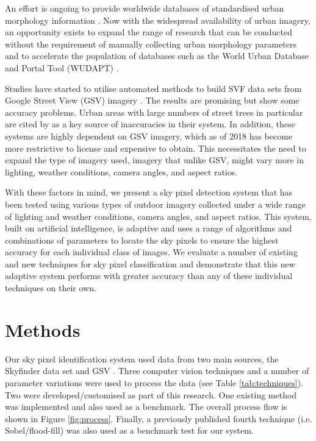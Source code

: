 \documentclass[final,3p,times,authoryear]{elsarticle}
\begin{document}
An effort is ongoing to provide worldwide databases of standardised urban morphology information \citep{Ching2018,Ching2019}. Now with the widespread availability of urban imagery, an opportunity exists to expand the range of research that can be conducted without the requirement of manually collecting urban morphology parameters and to accelerate the population of databases such as the World Urban Database and Portal Tool (WUDAPT) \citep{Mills2015}.

Studies have started to utilise automated methods to build SVF data sets from Google Street View (GSV) imagery \citep{Middel2018,Gong2018}. The results are promising but show some accuracy problems. Urban areas with large numbers of street trees in particular are cited by \cite{Gong2018} as a key source of inaccuracies in their system. In addition, these systems are highly dependent on GSV imagery, which as of 2018 has become more restrictive to license and expensive to obtain. This necessitates the need to expand the type of imagery used, imagery that unlike GSV, might vary more in lighting, weather conditions, camera angles, and aspect ratios. 

With these factors in mind, we present a sky pixel detection system that has been tested using various types of outdoor imagery collected under a wide range of lighting and weather conditions, camera angles, and aspect ratios. This system, built on artificial intelligence, is adaptive and uses a range of algorithms and combinations of parameters to locate the sky pixels to ensure the highest accuracy for each individual class of images. We evaluate a number of existing and new techniques for sky pixel classification and demonstrate that this new adaptive system performs with greater accuracy than any of these individual techniques on their own.



\section{Methods}\label{sec:Methods}
Our sky pixel identification system used data from two main sources, the Skyfinder data set \citep{Mihail2016} and GSV \citep{GoogleMaps2017b}. Three computer vision techniques and a number of parameter variations were used to process the data (see Table \ref{tab:techniques}). Two were developed/customised as part of this research. One existing method was implemented and also used as a benchmark. The overall process flow is shown in Figure \ref{fig:process}. Finally, a previously published fourth technique (i.e. Sobel/flood-fill) was also used as a benchmark test for our system.
\end{document}

